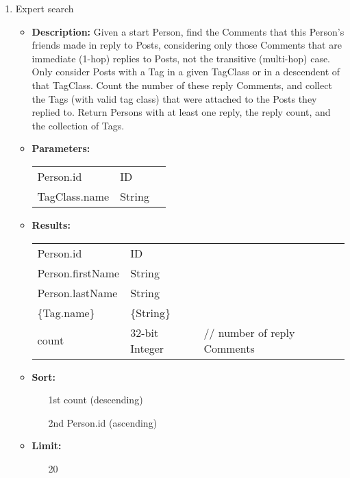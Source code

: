 {\begin{enumerate}
    \item Expert search
        \begin{itemize}
            \item \textbf{Description:}
                Given a start Person, find the Comments that this Person's
                friends made in reply to Posts, considering only those Comments
                that are immediate (1-hop) replies to Posts, not the transitive
                (multi-hop) case.  Only consider Posts with a Tag in a given
                TagClass or in a descendent of that TagClass.  Count the number
                of these reply Comments, and collect the Tags (with valid tag
                class) that were attached to the Posts they replied to.  Return
                Persons with at least one reply, the reply count, and
                the collection of Tags.
            \item \textbf{Parameters:} \\
                \begin{tabular}{lll}
                    Person.id 	 					& ID & \parbox[t]{20cm}{\par \strut} \\
                    TagClass.name	 				& String & \parbox[t]{20cm}{\par \strut} \\
                \end{tabular}
            \item \textbf{Results:} \\
                \begin{tabular}{lll}
                    Person.id 	 			& ID & \parbox[t]{20cm}{\par \strut} \\
                    Person.firstName 	 	& String & \parbox[t]{20cm}{\par \strut} \\
                    Person.lastName 	 	& String & \parbox[t]{20cm}{\par \strut} \\
                    \{Tag.name\} 	 			& \{String\} & \parbox[t]{20cm}{\par \strut} \\
                    count 	 				& 32-bit Integer & \parbox[t]{20cm}{// number of reply Comments\par \strut}
                \end{tabular}
            \item \textbf{Sort:}
                  \begin{itemize}
                    \item[1st] count (descending)
                    \item[2nd] Person.id (ascending)
                  \end{itemize}
            \item \textbf{Limit:}
                  \begin{itemize}
                    \item[] 20
                  \end{itemize}
        \end{itemize}


\end{enumerate}}
